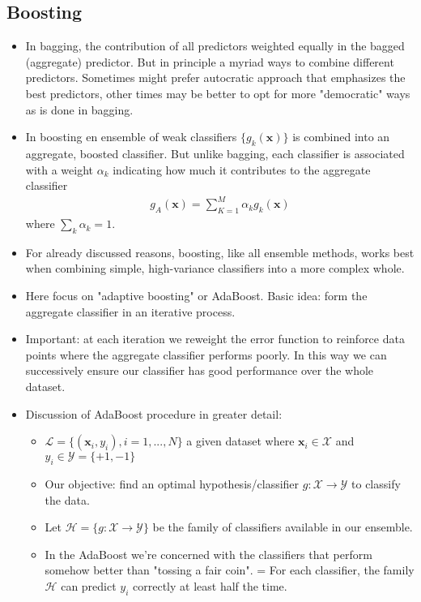 \documentclass[norsk,a4paper,11pt]{article}
\begin{document}
\subsection{Boosting}
\begin{itemize}
	\item In bagging, the contribution of all predictors weighted equally in the bagged (aggregate) predictor. But in principle a myriad ways to combine different predictors. Sometimes might prefer autocratic approach that emphasizes the best predictors, other times may be better to opt for more "democratic" ways as is done in bagging.
	\item In boosting en ensemble of weak classifiers $\{ g_k(\bm{x}) \}$ is combined into an aggregate, boosted classifier. But unlike bagging, each classifier is associated with a weight $\alpha_k$ indicating how much it contributes to the aggregate classifier
	\begin{align}
		g_A (\bm{x}) = \sum_{K=1}^M \alpha_k g_k (\bm{x})
	\end{align}
	where $\sum_k \alpha_k = 1$. 
	\item For already discussed reasons, boosting, like all ensemble methods, works best when combining simple, high-variance classifiers into a more complex whole.
	\item Here focus on "adaptive boosting" or AdaBoost. Basic idea: form the aggregate classifier in an iterative process. 
	\item Important: at each iteration we reweight the error function to reinforce data points where the aggregate classifier performs poorly. In this way we can successively ensure our classifier has good performance over the whole dataset.
	\item Discussion of AdaBoost procedure in greater detail:
	\begin{itemize}
		\item $\mathcal{L} = \{ (\bm{x}_i, y_i), i=1,...,N \}$ a given dataset where $\bm{x}_i \in \mathcal{X}$ and $y_i \in \mathcal{Y} = \{ +1, -1 \}$
		\item Our objective: find an optimal hypothesis/classifier $g: \mathcal{X} \rightarrow \mathcal{Y} $ to classify the data.
		\item Let $\mathcal{H} = \{ g : \mathcal{X} \rightarrow \mathcal{Y} \}$ be the family of classifiers available in our ensemble.
		\item In the AdaBoost we're concerned with the classifiers that perform somehow better than "tossing a fair coin". = For each classifier, the family $\mathcal{H}$ can predict $y_i$ correctly at least half the time.

\end{itemize}
\end{itemize}
\end{document}
